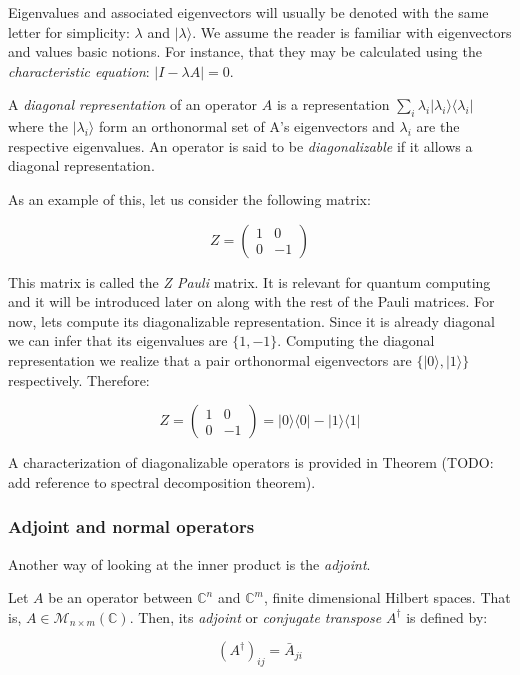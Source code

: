 Eigenvalues and associated eigenvectors will usually be denoted with the same letter for simplicity: $\lambda$ and $|\lambda\rangle$. We assume the reader is familiar with eigenvectors and values basic notions. For instance, that they may be calculated using the \emph{characteristic equation}: $|I - \lambda A| = 0$.

\begin{definition}
	A \emph{diagonal representation} of an operator $A$ is a representation $\sum_i \lambda_i |\lambda_i\rangle\langle\lambda_i|$ where the $|\lambda_i\rangle$ form an orthonormal set of A's eigenvectors and $\lambda_i$ are the respective eigenvalues. An operator is said to be \emph{diagonalizable} if it allows a diagonal representation.
\end{definition}

\begin{exampleth}
	As an example of this, let us consider the following matrix:
	
	$$ Z = 
	\begin{pmatrix}
		1 & 0 \\
		0 & -1 
	\end{pmatrix}
	$$
	
	This matrix is called the \emph{Z Pauli} matrix. It is relevant for quantum computing and it will be introduced later on along with the rest of the Pauli matrices. For now, lets compute its diagonalizable representation. Since it is already diagonal we can infer that its eigenvalues are $\{1, -1\}$. Computing the diagonal representation we realize that a pair orthonormal eigenvectors are $\{|0\rangle, |1\rangle\}$ respectively. Therefore:
	
	$$ Z = 
	\begin{pmatrix}
		1 & 0 \\
		0 & -1 
	\end{pmatrix} = 
	|0\rangle\langle0| - |1\rangle\langle1|
	$$
\end{exampleth}

A characterization of diagonalizable operators is provided in Theorem (TODO: add reference to spectral decomposition theorem).

\subsubsection{Adjoint and normal operators}

Another way of looking at the inner product is the \emph{adjoint}.

\begin{definition}
	Let $A$ be an operator between $\mathds{C}^n$ and $\mathds{C}^m$, finite dimensional Hilbert spaces. That is, $A \in \mathcal{M}_{n{\times}m}(\mathds{C})$. Then, its \emph{adjoint} or \emph{conjugate transpose} $A^\dagger$ is defined by:
	
	$$ (A^\dagger)_{ij} = \bar A_{ji} $$
\end{definition}

